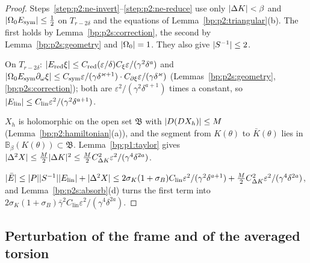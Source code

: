 \begin{proof}
\label{step:p2s:ne-id}
Steps~\ref{step:p2:ne-invert}--\ref{step:p2:ne-reduce} use only $\lvert \Delta K\rvert<\beta$ and $\lvert \Omega_0E_{\mathrm{sym}}\rvert\le\frac12$ on
$T_{r-2\delta}$ and the equations of Lemma~\ref{bp:p2:triangular}(b). The first holds by Lemma~\ref{bp:p2s:correction}, the second by
Lemma~\ref{bp:p2s:geometry} and $\lvert \Omega_0\rvert=1$. They also give $\lvert S^{-1}\rvert\le2$.

\label{step:p2s:ne-lin}
On $T_{r-2\delta}$: $\lvert E_{\mathrm{red}}\xi\rvert\le C_{\mathrm{red}}(\varepsilon/\delta)C_\xi\varepsilon/(\gamma^2\delta^a)$ and
$\lvert \Omega_0E_{\mathrm{sym}}\partial_\omega\xi\rvert\le C_{\mathrm{sym}}\varepsilon/(\gamma\delta^{\varkappa+1})\cdot C_{\partial\xi}\varepsilon/(\gamma\delta^\varkappa)$
(Lemmas~\ref{bp:p2s:geometry}, \ref{bp:p2s:correction}); both are $\varepsilon^2/(\gamma^2\delta^{a+1})$ times a constant, so
$\lvert E_{\mathrm{lin}}\rvert\le C_{\mathrm{lin}}\varepsilon^2/(\gamma^2\delta^{a+1})$.

\label{step:p2s:ne-quad}
$X_h$ is holomorphic on the open set $\mathfrak B$ with $\lvert D(DX_h)\rvert\le M$ (Lemma~\ref{bp:p2:hamiltonian}(a)), and the segment from
$K(\theta)$ to $\bar K(\theta)$ lies in $\mathbb B_\beta(K(\theta))\subset\mathfrak B$. Lemma~\ref{bp:p1:taylor} gives
$\lvert \Delta^2X\rvert\le\frac M2\lvert \Delta K\rvert^2\le\frac M2C_{\Delta K}^2\varepsilon^2/(\gamma^4\delta^{2a})$.

\label{step:p2s:ne-total}
$\lvert \bar E\rvert\le\lvert P\rvert\lvert S^{-1}\rvert\lvert E_{\mathrm{lin}}\rvert+\lvert \Delta^2X\rvert\le2\sigma_K(1+\sigma_B)C_{\mathrm{lin}}\varepsilon^2/(\gamma^2\delta^{a+1})
+\frac M2C_{\Delta K}^2\varepsilon^2/(\gamma^4\delta^{2a})$, and Lemma~\ref{bp:p2s:absorb}(d) turns the first term into
$2\sigma_K(1+\sigma_B)\bar\gamma^2C_{\mathrm{lin}}\varepsilon^2/(\gamma^4\delta^{2a})$.
\end{proof}

\subsection{Perturbation of the frame and of the averaged torsion}\label{bp:p2s:sec-perturbation}

